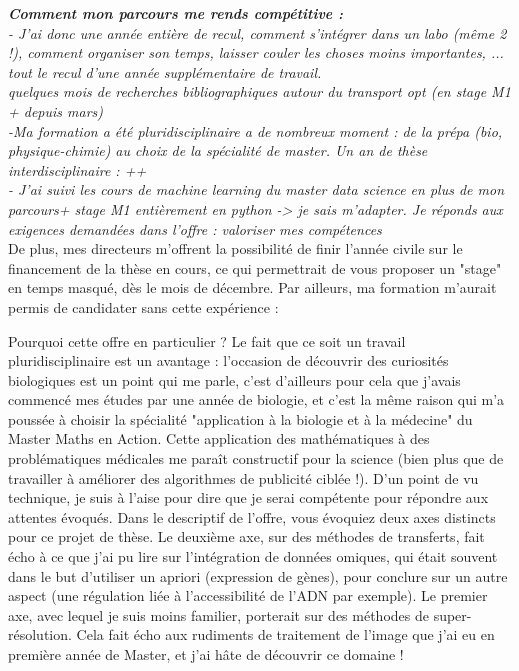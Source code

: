 \documentclass[a4paper,12pt]{article}
\begin{document}
\textit{ 
\textbf{Comment mon parcours me rends compétitive : }\\
- J'ai donc une année entière de recul, comment s'intégrer dans un labo (même 2 !), comment organiser son temps, laisser couler les choses moins importantes, ... tout le recul d'une année supplémentaire de travail.  \\
quelques mois de recherches bibliographiques autour du transport opt (en stage M1 + depuis mars) \\
-Ma formation a été pluridisciplinaire a de nombreux moment : de la prépa (bio, physique-chimie) au choix de la spécialité de master. Un an de thèse interdisciplinaire : ++ \\
- J'ai suivi les cours de machine learning du master data science en plus de mon parcours+ stage M1 entièrement en python -> je sais m'adapter.
Je réponds aux exigences demandées dans l'offre : valoriser mes compétences
}    \\
    
De plus, mes directeurs m'offrent la possibilité de finir l'année civile sur le financement de la thèse en cours, ce qui permettrait de vous proposer un "stage" en temps masqué, dès le mois de décembre.
Par ailleurs, ma formation m'aurait permis de candidater sans cette expérience : 


Pourquoi cette offre en particulier ? Le fait que ce soit un travail pluridisciplinaire est un avantage : l'occasion de découvrir des curiosités biologiques est un point qui me parle, c'est d'ailleurs pour cela que j'avais commencé mes études par une année de biologie, et c'est la même raison qui m'a poussée à choisir la spécialité "application à la biologie et à la médecine" du Master Maths en Action. Cette application des mathématiques à des problématiques médicales me paraît constructif pour la science (bien plus que de travailler à améliorer des algorithmes de publicité ciblée !). 
D'un point de vu technique, je suis à l'aise pour dire que je serai compétente pour répondre aux attentes évoqués. Dans le descriptif de l'offre, vous évoquiez deux axes distincts pour ce projet de thèse. Le deuxième axe, sur des méthodes de transferts, fait écho à ce que j'ai pu lire sur l'intégration de données omiques, qui était souvent dans le but d'utiliser un apriori (expression de gènes), pour conclure sur un autre aspect (une régulation liée à l'accessibilité de l'ADN par exemple). Le premier axe, avec lequel je suis moins familier, porterait sur des méthodes de super-résolution. Cela fait écho aux rudiments de traitement de l'image que j'ai eu en première année de Master, et j'ai hâte de découvrir ce domaine !%
\end{document}
